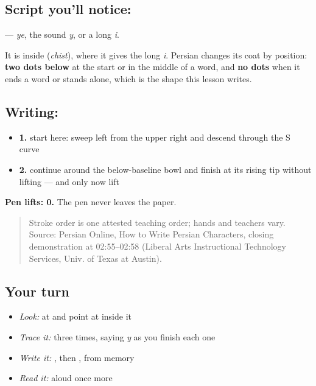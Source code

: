 \subsection*{Script you'll notice: }
\textbf{} — \emph{ye}, the sound \emph{y}, or a long \emph{i}.

It is inside \textbf{} (\emph{chist}), where it gives the long \emph{i}. Persian \textbf{} changes its coat by position: \textbf{two dots below} at the start or in the middle of a word, and \textbf{no dots} when it ends a word or stands alone, which is the shape this lesson writes.

\subsection*{Writing: }

\begin{itemize}
\raggedright
  \item \textbf{1.} start here: sweep left from the upper right and descend through the S curve
  \item \textbf{2.} continue around the below-baseline bowl and finish at its rising tip without lifting — and only now lift
\end{itemize}

\textbf{Pen lifts: 0.} The pen never leaves the paper.

\begin{quote}
Stroke order is one attested teaching order; hands and teachers vary. Source: Persian Online, How to Write Persian Characters, closing  demonstration at 02:55–02:58 (Liberal Arts Instructional Technology Services, Univ. of Texas at Austin).
\end{quote}

\subsection*{Your turn}
\begin{itemize}
\raggedright
  \item \emph{Look:} at \textbf{} and point at  inside it
  \item \emph{Trace it:}  three times, saying \emph{y} as you finish each one
  \item \emph{Write it:} , then , from memory
  \item \emph{Read it:} \textbf{} aloud once more
\end{itemize}

